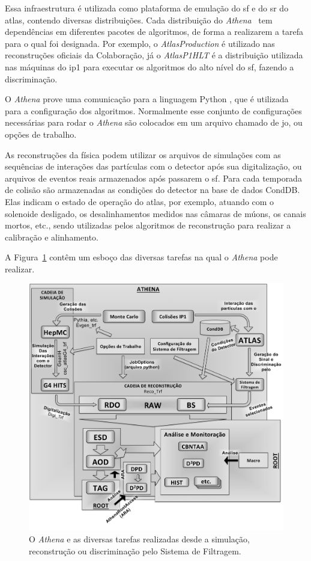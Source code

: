 Essa infraestrutura é utilizada como plataforma de emulação do \glsdesc{sf} e do 
\gls{sr} do \gls{atlas}, contendo diversas
distribuições. Cada distribuição do \emph{Athena}~\cite{atlas_computing_tdr} 
tem dependências em diferentes
pacotes de algoritmos, de forma a realizarem a tarefa para o qual foi designada. 
Por exemplo, o \emph{AtlasProduction} é utilizado 
nas reconstruções oficiais da Colaboração, já o \emph{AtlasP1HLT} é a
distribuição utilizada nas máquinas do \gls{ip}1 para executar os algoritmos 
do alto nível do \glsdesc{sf}, fazendo a discriminação. 

O \emph{Athena} prove uma comunicação para a
linguagem Python \cite{webPython}, que é utilizada para a configuração dos algoritmos.
Normalmente esse conjunto de configurações necessárias para rodar o \emph{Athena} são 
colocados em um arquivo chamado de \gls{jo}, ou opções de trabalho.

As reconstruções da física podem utilizar os arquivos de simulações com as sequências de
interações das partículas com o detector após sua digitalização, ou arquivos de eventos
reais armazenados após passarem o \glsdesc{sf}. Para cada temporada de
colisão são armazenadas as condições do detector na base de dados CondDB.
Elas indicam o estado de operação do \gls{atlas}, por exemplo, atuando com o
solenoide desligado, os desalinhamentos medidos nas câmaras de múons, os canais
mortos, etc., sendo utilizadas pelos algoritmos de reconstrução 
para realizar a calibração e alinhamento.

A Figura~\ref{fig:cadeia_athena} contêm um esboço das diversas tarefas na qual o
\emph{Athena} pode realizar.

\begin{figure}[h!t]
\centering
\includegraphics[width=\textwidth]{imagens/cadeia_athena.pdf}
\caption{O \emph{Athena} e as diversas tarefas realizadas desde a simulação,
reconstrução ou discriminação pelo Sistema de Filtragem.}
\label{fig:cadeia_athena}
\end{figure}

